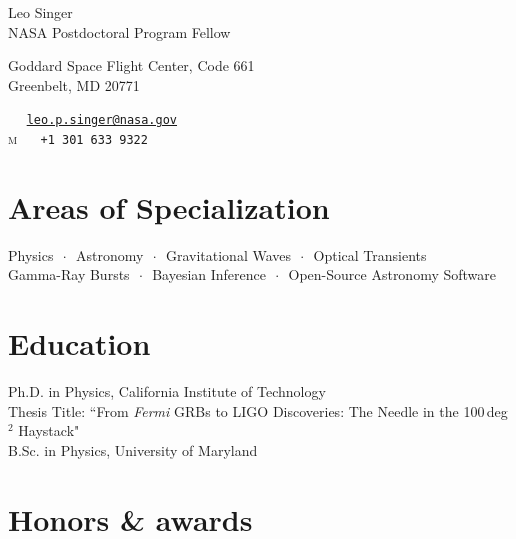 \documentclass[10pt, letterpaper]{article} %
\newcommand{\listsep}{$\,\cdot\,$}
\newcommand{\years}[1]{\marginnote{\scriptsize #1}} %
\begin{document}

{\LARGE Leo Singer}\\[1cm] %
NASA Postdoctoral Program Fellow\\
\begin{minipage}[t][2cm][s]{8cm}
Goddard Space Flight Center, Code 661 \\ %
Greenbelt, MD 20771\\[.2cm]
\end{minipage}\begin{minipage}[t][2cm][s]{5cm}
{\tiny\faEnvelopeAlt} \,\,\,\,\,\, \href{mailto:leo.p.singer@nasa.gov}{\small \texttt{leo.p.singer@nasa.gov}}\\
\textsc{m} \,\,\,\,\,\, \texttt{\small +1 301 633 9322}\\ %
\end{minipage}

\section*{Areas of Specialization}

Physics \listsep{}  Astronomy \listsep{} Gravitational Waves \listsep{} Optical Transients \\
Gamma-Ray Bursts \listsep{}  Bayesian Inference \listsep{} Open-Source Astronomy Software

\section*{Education}

\years{2015} Ph.D. in Physics, California Institute of Technology\\
Thesis Title: “From \emph{Fermi} GRBs to LIGO Discoveries: The Needle in the 100\,deg$^2$ Haystack"\\[0.125cm]
%
\years{2009}B.Sc. in Physics, University of Maryland

\section*{Honors \& awards}
\end{document}
